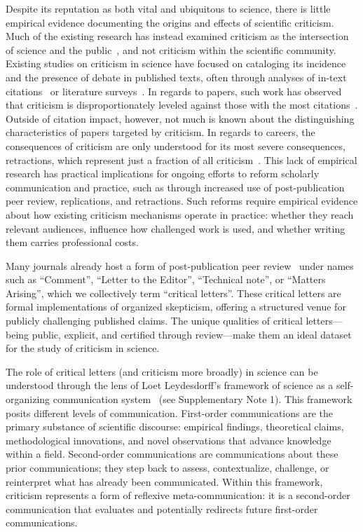 \documentclass[12pt,a4paper]{article}
\numberwithin{equation}{section}
\begin{document}
Despite its reputation as both vital and ubiquitous to science, there is little empirical evidence documenting the origins and effects of scientific criticism.
Much of the existing research has instead examined criticism as the intersection of science and the public~\cite{oreskes_2010_merchants, deroover_2022_experts, lewandowsky_2012_consensus}, and not criticism within the scientific community.
Existing studies on criticism in science have focused on cataloging its incidence and the presence of debate in published texts, often through analyses of in-text citations~\cite{lamers_2021_disagreement,catalini_2015_negative} or literature surveys~\cite{cook_2013_quantifying}.
In regards to papers, such work has observed that criticism is disproportionately leveled against those with the most citations~\cite{catalini_2015_negative,radicchi_2012_comment}.
Outside of citation impact, however, not much is known about the distinguishing characteristics of papers targeted by criticism.
In regards to careers, the consequences of criticism are only understood for its most severe consequences, retractions, which represent just a fraction of all criticism~\cite{azoulay_2017_scandal,peng2022retracted}.
This lack of empirical research has practical implications for ongoing efforts to reform scholarly communication and practice, such as through increased use of post-publication peer review, replications, and retractions. 
Such reforms require empirical evidence about how existing criticism mechanisms operate in practice: whether they reach relevant audiences, influence how challenged work is used, and whether writing them carries professional costs. 

Many journals already host a form of post-publication peer review~\cite{hardwicke_2022_critique} under names such as ``Comment'', ``Letter to the Editor'', ``Technical note'', or ``Matters Arising'', which we collectively term ``critical letters''.
These critical letters are formal implementations of organized skepticism, offering a structured venue for publicly challenging published claims.
The unique qualities of critical letters---being public, explicit, and certified through review---make them an ideal dataset for the study of criticism in science. 

The role of critical letters (and criticism more broadly) in science can be understood through the lens of Loet Leydesdorff's framework of science as a self-organizing communication system~\cite{leydesdorff2001sociological,leydesdorff2010communication} (see Supplementary Note 1).
This framework posits different levels of communication.
First-order communications are the primary substance of scientific discourse: empirical findings, theoretical claims, methodological innovations, and novel observations that advance knowledge within a field.
Second-order communications are communications about these prior communications;
they step back to assess, contextualize, challenge, or reinterpret what has already been communicated.
Within this framework, criticism represents a form of reflexive meta-communication: it is a second-order communication that evaluates and potentially redirects future first-order communications.
\end{document}
